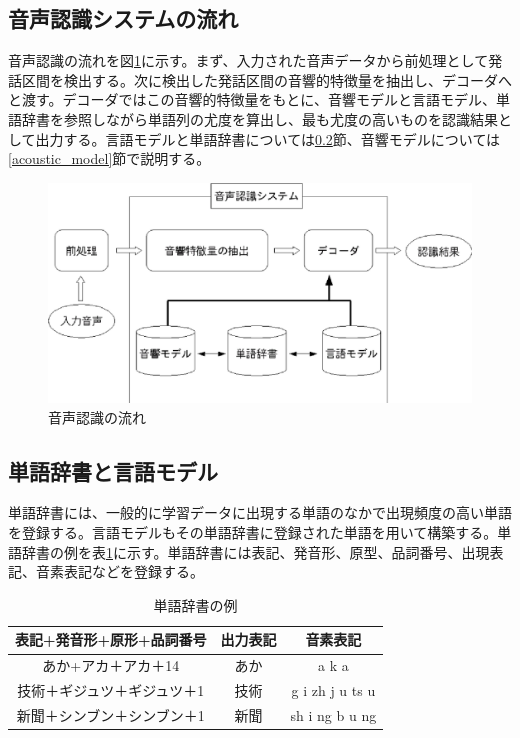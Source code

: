 \subsection{音声認識システムの流れ}
音声認識の流れを図\ref{fig:flow_sp}に示す。まず、入力された音声データから前処理として発話区間を検出する。次に検出した発話区間の音響的特徴量を抽出し、デコーダへと渡す。デコーダではこの音響的特徴量をもとに、音響モデルと言語モデル、単語辞書を参照しながら単語列の尤度を算出し、最も尤度の高いものを認識結果として出力する。言語モデルと単語辞書については\ref{language_model}節、音響モデルについては\ref{acoustic_model}節で説明する。

\begin{figure}[H]
  \begin{center}
    \includegraphics{./figure/flow_sp.eps}
  \end{center}
  \caption{音声認識の流れ}
  \label{fig:flow_sp}
\end{figure}

\subsection{単語辞書と言語モデル}
\label{language_model}

\par
単語辞書には、一般的に学習データに出現する単語のなかで出現頻度の高い単語を登録する\cite{sp_recognition_shikano}。言語モデルもその単語辞書に登録された単語を用いて構築する。単語辞書の例を表\ref{table:tango}に示す。単語辞書には表記、発音形、原型、品詞番号、出現表記、音素表記などを登録する。\par

\begin{table}[H]
  \begin{center}
    \caption{単語辞書の例}
    \begin{tabular}{|c||c|c|} \hline
      表記+発音形+原形+品詞番号 & 出力表記 & 音素表記 \\ \hline
      あか+アカ＋アカ＋14 & あか & a k a \\ \hline
      技術＋ギジュツ＋ギジュツ＋1 & 技術 & g i zh j u ts u \\ \hline
      新聞＋シンブン＋シンブン＋1 & 新聞 & sh i ng b u ng \\ \hline
    \end{tabular}
    \label{table:tango}
  \end{center}
\end{table}

